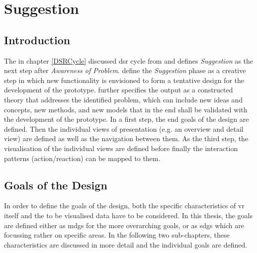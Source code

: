 
\chapter{Suggestion}

\label{ChapterSuggestion}


\section{Introduction}

The in chapter \ref{DSRCycle} discussed \gls{dsr} cycle from \cite{Vaishnavi2008} and \cite{Hevner2010} defines \textit{Suggestion} as the next step after \textit{Awareness of Problem}. \cite{Vaishnavi2008} define the \textit{Suggestion} phase as a creative step in which new functionality is envisioned to form a tentative design for the development of the prototype. \cite{Vaishnavi2008} further specifies the output as a constructed theory that addresses the identified problem, which can include new ideas and concepts, new methods, and new models that in the end shall be validated with the development of the prototype. \newline
In a first step, the end goals of the design are defined. Then the individual views of presentation (e.g. an overview and detail view) are defined as well as the navigation between them. As the third step, the visualisation of the individual views are defined before finally the interaction patterns (action/reaction) can be mapped to them.



\section{Goals of the Design}

In order to define the goals of the design, both the specific characteristics of \gls{vr} itself and the to be visualised data have to be considered. In this thesis, the goals are defined either as \glspl{mdg} for the more overarching goals, or as \glspl{sdg} which are focussing rather on specific areas. In the following two sub-chapters, these characteristics are discussed in more detail and the individual goals are defined.


